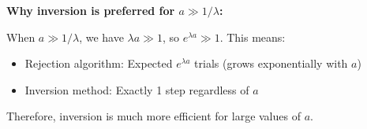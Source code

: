 \textbf{Why inversion is preferred for $a \gg 1/\lambda$:}

When $a \gg 1/\lambda$, we have $\lambda a \gg 1$, so $e^{\lambda a} \gg 1$. This means:
\begin{itemize}
\item Rejection algorithm: Expected $e^{\lambda a}$ trials (grows exponentially with $a$)
\item Inversion method: Exactly 1 step regardless of $a$
\end{itemize}

Therefore, inversion is much more efficient for large values of $a$.